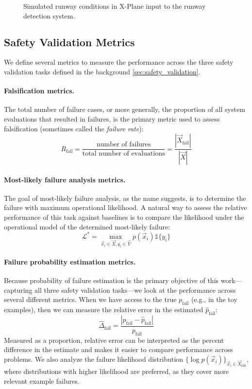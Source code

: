 \begin{figure}[t!]
    \caption{Simulated runway conditions in X-Plane input to the runway detection system.}
    \label{fig:radnet_xplane}
\end{figure}


\subsection{Safety Validation Metrics}
We define several metrics to measure the performance across the three safety validation tasks \cite{corso2021survey} defined in the background \cref{sec:safety_validation}.

\paragraph{Falsification metrics.} The total number of failure cases, or more generally, the proportion of all system evaluations that resulted in failures, is the primary metric used to assess falsification (sometimes called the \textit{failure rate}):
\begin{equation}
    R_\text{fail} = \frac{\text{number of failures}}{\text{total number of evaluations}} = \frac{|\vec{X}_\text{fail}|}{|\vec{X}|}
\end{equation}

\paragraph{Most-likely failure analysis metrics.} The goal of most-likely failure analysis, as the name suggests, is to determine the failure with maximum operational likelihood. A natural way to assess the relative performance of this task against baselines is to compare the likelihood under the operational model of the determined most-likely failure:
\begin{equation}
    \mathcal{L}^* = \max_{\vec{x}_i \in \vec{X}, y_i \in \vec{Y}} p(\vec{x}_i)\mathds{1}\{y_i\}
\end{equation}

\paragraph{Failure probability estimation metrics.} Because probability of failure estimation is the primary objective of this work---capturing all three safety validation tasks---we look at the performance across several different metrics.
When we have access to the true $p_\text{fail}$ (e.g., in the toy examples), then we can measure the relative error in the estimated $\hat{p}_\text{fail}$:
\begin{equation}
    \hat{\Delta}_\text{fail} = \frac{|p_\text{fail} - \hat{p}_\text{fail}|}{p_\text{fail}} \label{eq:pfail_error}
\end{equation}
Measured as a proportion, relative error can be interpreted as the percent difference in the estimate and makes it easier to compare performance across problems.
We also analyze the failure likelihood distribution $\{\log p(\vec{x}_i)\}_{\vec{x}_i \in \vec{X}_\text{fail}}$, where distributions with higher likelihood are preferred, as they cover more relevant example failures.


